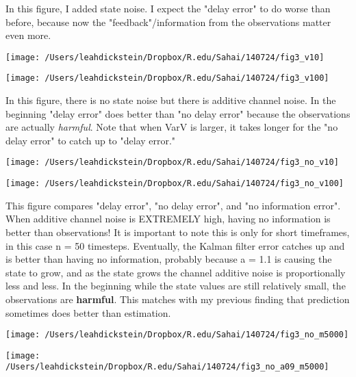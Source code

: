 \documentclass[leqno,twocolumn]{article}
\begin{document}
In this figure, I added state noise. I expect the "delay error" to do worse than before, because now the "feedback"/information from the observations matter even more.

\begin{minipage}[c]{0.5\textwidth}
\texttt{[image: /Users/leahdickstein/Dropbox/R.edu/Sahai/140724/fig3\_v10]}
\end{minipage}
\begin{minipage}[c]{0.5\textwidth}
\texttt{[image: /Users/leahdickstein/Dropbox/R.edu/Sahai/140724/fig3\_v100]}
\end{minipage}

In this figure, there is no state noise but there is additive channel noise. In the beginning "delay error" does better than "no delay error" because the observations are actually \textit{harmful}. Note that when VarV is larger, it takes longer for the "no delay error" to catch up to "delay error."

\begin{minipage}[c]{0.5\textwidth}
\texttt{[image: /Users/leahdickstein/Dropbox/R.edu/Sahai/140724/fig3\_no\_v10]}
\end{minipage}
\begin{minipage}[c]{0.5\textwidth}
\texttt{[image: /Users/leahdickstein/Dropbox/R.edu/Sahai/140724/fig3\_no\_v100]}
\end{minipage}

This figure compares "delay error", "no delay error", and "no information error". When additive channel noise is EXTREMELY high, having no information is better than observations! It is important to note this is only for short timeframes, in this case n = 50 timesteps. Eventually, the Kalman filter error catches up and is better than having no information, probably because a = 1.1 is causing the state to grow, and as the state grows the channel additive noise is proportionally less and less. In the beginning while the state values are still relatively small, the observations are \textbf{harmful}. This matches with my previous finding that prediction sometimes does better than estimation.

\begin{minipage}[c]{0.5\textwidth}
\texttt{[image: /Users/leahdickstein/Dropbox/R.edu/Sahai/140724/fig3\_no\_m5000]}
\end{minipage}
\begin{minipage}[c]{0.5\textwidth}
\texttt{[image: /Users/leahdickstein/Dropbox/R.edu/Sahai/140724/fig3\_no\_a09\_m5000]}
\end{minipage}
\end{document}
